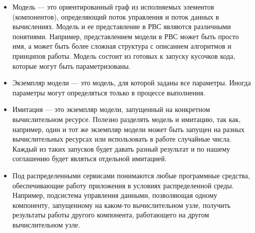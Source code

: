 \begin{itemize}
  \item Модель --- это ориентированный граф из исполняемых элементов (компонентов), определяющий поток управления и поток данных в вычислениях. Модель и ее представление в РВС являются различными понятиями. Например, представлением модели в РВС может быть просто имя, а может быть более сложная структура с описанием алгоритмов и принципов работы. Модель состоит из готовых к запуску кусочков кода, которые могут быть параметризованы.
  \item Экземпляр модели --- это модель, для которой заданы все параметры. Иногда параметры могут определяться только в процессе выполнения. 
  \item Имитация --- это экземпляр модели, запущенный на конкретном вычислительном ресурсе. Полезно разделять модель и имитацию, так как, например, один и тот же экземпляр модели может быть запущен на разных вычислительных ресурсах или использовать в работе случайные числа. Каждый из таких запусков будет давать разный результат и по нашему соглашению будет являться отдельной имитацией.
  \item Под распределенными сервисами понимаются любые программные средства, обеспечивающие работу приложения в условиях распределенной среды. Например, подсистема управления данными, позволяющая одному компоненту, запущенному на каком-то вычислительном узле, получить результаты работы другого компонента, работающего на другом вычислительном узле.
\end{itemize}
